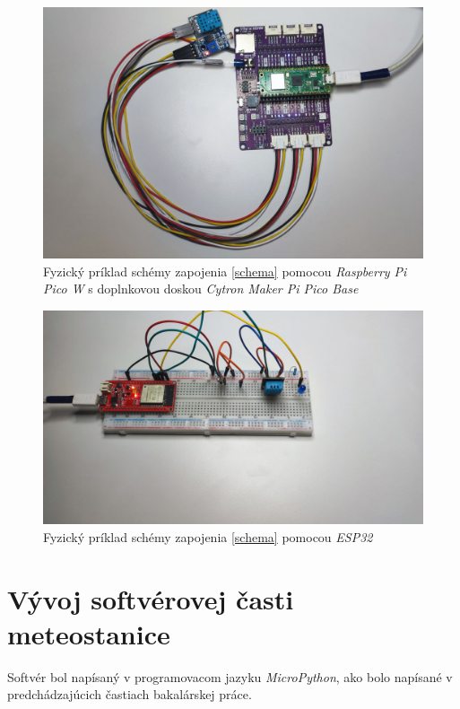 \begin{figure}[!ht]
    \centering
    \includegraphics[width=\textwidth]{figures/f_bord_pico}
    \caption{Fyzický príklad schémy zapojenia \ref{schema} pomocou \textit{Raspberry Pi Pico W} s doplnkovou doskou \textit{Cytron Maker Pi Pico Base}\label{f_b_pico}}
\end{figure}

\begin{figure}[!ht]
    \centering
    \includegraphics[width=\textwidth]{figures/f_esp32}
    \caption{Fyzický príklad schémy zapojenia \ref{schema} pomocou \textit{ESP32} \label{f_esp32}}
\end{figure}


\section{Vývoj softvérovej časti meteostanice}
Softvér bol napísaný v programovacom jazyku \textit{MicroPython}, ako bolo napísané v predchádzajúcich častiach bakalárskej práce. 

